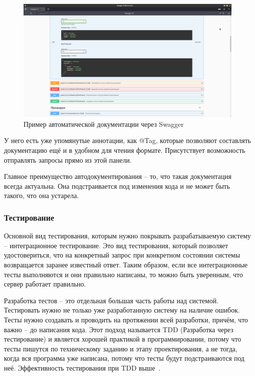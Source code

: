 \documentclass[a4paper,article]{article}
\begin{document}
\begin{sloppypar}
    \begin{figure}[h]
        \centering
        \includegraphics[width=0.8\linewidth]{Swagger.png}
        \caption{\centering Пример автоматической документации через Swagger}
        \label{fig:Swagger}
    \end{figure}

    У него есть уже упомянутые аннотации, как @Tag, которые позволяют составлять документацию ещё и в удобном для чтения формате. Присутствует возможность отправлять запросы прямо из этой панели.

    Главное преимущество автодокументирования -- то, что такая документация всегда актуальна. Она подстраивается под изменения кода и не может быть такого, что она устарела.

    \subsubsection{Тестирование}\label{Реализация. Сервер. Тестирование}

    Основной вид тестирования, которым нужно покрывать разрабатываемую систему -- интеграционное тестирование. Это вид тестирования, который позволяет удостовериться, что на конкретный запрос при конкретном состоянии системы возвращается заранее известный ответ. Таким образом, если все интеграционные тесты выполняются и они правильно написаны, то можно быть уверенным, что сервер работает правильно.

    Разработка тестов -- это отдельная большая часть работы над системой. Тестировать нужно не только уже разработанную систему на наличие ошибок. Тесты нужно создавать и проводить на протяжении всей разработки, причём, что важно -- до написания кода. Этот подход называется TDD (Разработка через тестирование) и является хорошей практикой в программировании, потому что тесты пишутся по техническому заданию и этапу проектирования, а не тогда, когда вся программа уже написана, потому что тесты будут подстраиваются под неё. Эффективность тестирования при TDD выше~\cite{cleancode}.


\end{sloppypar}
\end{document}
